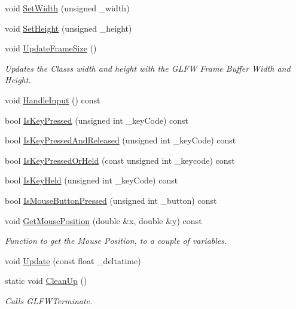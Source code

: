 \begin{DoxyCompactItemize}
\item 
void \mbox{\hyperlink{class_window_a2fba7009a94faaef315b90509124a65c}{Set\+Width}} (unsigned \+\_\+width)
\item 
void \mbox{\hyperlink{class_window_a28843b64d34ec006f51274e154a81f00}{Set\+Height}} (unsigned \+\_\+height)
\item 
void \mbox{\hyperlink{class_window_ac825ddc0aeda29fae94c5fc910f3f04d}{Update\+Frame\+Size}} ()
\begin{DoxyCompactList}\small\item\em Updates the Class\textquotesingle{}s width and height with the G\+L\+FW Frame Buffer Width and Height. \end{DoxyCompactList}\item 
void \mbox{\hyperlink{class_window_a6703058dead0231b089862ad1e226c70}{Handle\+Input}} () const
\item 
bool \mbox{\hyperlink{class_window_a72708934a1134a2ad9729f45719902a7}{Is\+Key\+Pressed}} (unsigned int \+\_\+key\+Code) const
\item 
bool \mbox{\hyperlink{class_window_a4000d4a6212d66cb1b14023cfb68c3a0}{Is\+Key\+Pressed\+And\+Released}} (unsigned int \+\_\+key\+Code) const
\item 
bool \mbox{\hyperlink{class_window_a78186413fc84fbb83f1c5c8a230d45fa}{Is\+Key\+Pressed\+Or\+Held}} (const unsigned int \+\_\+keycode) const
\item 
bool \mbox{\hyperlink{class_window_a2d13c2ec079ed3f8e907969781217c93}{Is\+Key\+Held}} (unsigned int \+\_\+key\+Code) const
\item 
bool \mbox{\hyperlink{class_window_a174de5939a61138e7c3cfe0136716f01}{Is\+Mouse\+Button\+Pressed}} (unsigned int \+\_\+button) const
\item 
void \mbox{\hyperlink{class_window_a65b02b0e52540d4c2c9d13689f4ec45a}{Get\+Mouse\+Position}} (double \&x, double \&y) const
\begin{DoxyCompactList}\small\item\em Function to get the Mouse Position, to a couple of variables. \end{DoxyCompactList}\item 
void \mbox{\hyperlink{class_window_a86a9ed5f891a93f0c3c44d8577be4e71}{Update}} (const float \+\_\+deltatime)
\item 
static void \mbox{\hyperlink{class_window_ab0d4c2fa778638e6fde90fc221124384}{Clean\+Up}} ()
\begin{DoxyCompactList}\small\item\em Calls G\+L\+F\+W\+Terminate. \end{DoxyCompactList}\end{DoxyCompactItemize}


